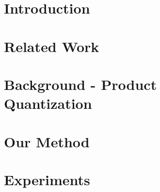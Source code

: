 \documentclass{article}  %
\begin{document}
\section{Introduction} \label{sec:intro}



\section{Related Work} \label{sec:relatedWork}


% 

\vspace{-1.5mm}
\section{Background - Product Quantization} \label{sec:background}
\vspace{-.5mm}



\vspace{-3mm}
\section{Our Method} \label{sec:method}
\vspace{-.5mm}



\section{Experiments} \label{sec:results}
\end{document}
